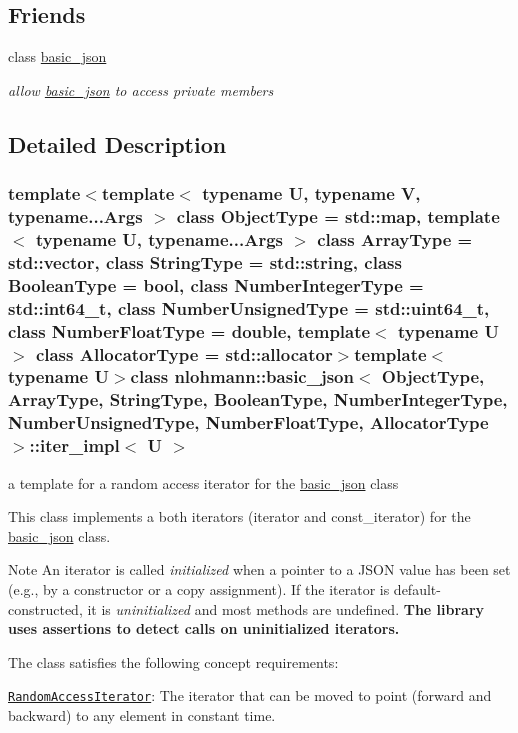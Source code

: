 \subsection*{Friends}
\begin{DoxyCompactItemize}
\item 
class \hyperlink{classnlohmann_1_1basic__json_1_1iter__impl_ada3100cdb8700566051828f1355fa745}{basic\+\_\+json}
\begin{DoxyCompactList}\small\item\em allow \hyperlink{classnlohmann_1_1basic__json}{basic\+\_\+json} to access private members \end{DoxyCompactList}\end{DoxyCompactItemize}


\subsection{Detailed Description}
\subsubsection*{template$<$template$<$ typename U, typename V, typename...\+Args $>$ class Object\+Type = std\+::map, template$<$ typename U, typename...\+Args $>$ class Array\+Type = std\+::vector, class String\+Type = std\+::string, class Boolean\+Type = bool, class Number\+Integer\+Type = std\+::int64\+\_\+t, class Number\+Unsigned\+Type = std\+::uint64\+\_\+t, class Number\+Float\+Type = double, template$<$ typename U $>$ class Allocator\+Type = std\+::allocator$>$template$<$typename U$>$class nlohmann\+::basic\+\_\+json$<$ Object\+Type, Array\+Type, String\+Type, Boolean\+Type, Number\+Integer\+Type, Number\+Unsigned\+Type, Number\+Float\+Type, Allocator\+Type $>$\+::iter\+\_\+impl$<$ U $>$}

a template for a random access iterator for the \hyperlink{classnlohmann_1_1basic__json}{basic\+\_\+json} class 

This class implements a both iterators (iterator and const\+\_\+iterator) for the \hyperlink{classnlohmann_1_1basic__json}{basic\+\_\+json} class.

\begin{DoxyNote}{Note}
An iterator is called {\itshape initialized} when a pointer to a J\+S\+O\+N value has been set (e.\+g., by a constructor or a copy assignment). If the iterator is default-\/constructed, it is {\itshape uninitialized} and most methods are undefined. {\bfseries The library uses assertions to detect calls on uninitialized iterators.}
\end{DoxyNote}
The class satisfies the following concept requirements\+:
\begin{DoxyItemize}
\item \href{http://en.cppreference.com/w/cpp/concept/RandomAccessIterator}{\tt Random\+Access\+Iterator}\+: The iterator that can be moved to point (forward and backward) to any element in constant time.
\end{DoxyItemize}

